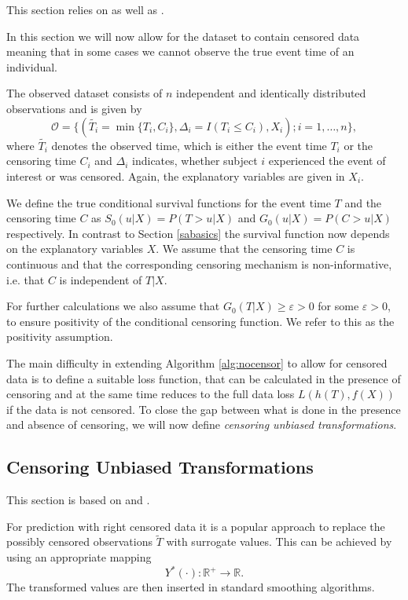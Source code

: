 \documentclass[12pt, a4paper]{scrartcl}
\theoremstyle{definition}
\theoremstyle{plain}
\numberwithin{equation}{section}
\numberwithin{figure}{section}
\numberwithin{table}{section}
\begin{document}
	This section relies on \citet*{basearticle} as well as \citet*{deeplbook}.
	
	In this section we will now allow for the dataset to contain censored data meaning that in some cases we cannot observe the true event time of an individual.
	
	The observed dataset consists of $n$ independent and identically distributed observations and is given by
	$$\mathcal{O} = \{(\tilde{T_i} = \min \{T_i, C_i\}, \Delta_i = I(T_i \leq C_i), X_i); i = 1,\dots,n\},$$
	 where $\tilde{T_i}$ denotes the observed time, which is either the event time $T_i$ or the censoring time $C_i$ and $\Delta_i$ indicates, whether subject $i$ experienced the event of interest or was censored.
	 Again, the explanatory variables are given in $X_i$.
	 
	 We define the true conditional survival functions for the event time $T$ and the censoring time $C$ as $S_0(u \vert X)=P(T>u \vert X)$ and $G_0(u \vert X)=P(C>u \vert X)$ respectively.
	 In contrast to Section \ref{sabasics} the survival function now depends on the explanatory variables $X$.
	 We assume that the censoring time $C$ is continuous and that the corresponding censoring mechanism is non-informative, i.e. that $C$ is independent of $T\vert X$.
	 
	 For further calculations we also assume that $G_0(T \vert X)\geq \varepsilon > 0$ for some $\varepsilon >0$, to ensure positivity of the conditional censoring function.
	 We refer to this as the positivity assumption.
	
	The main difficulty in extending Algorithm \ref{alg:nocensor} to allow for censored data is to define a suitable loss function, that can be calculated in the presence of censoring and at the same time reduces to the full data loss $L(h(T), f(X))$ if the data is not censored.
	To close the gap between what is done in the presence and absence of censoring, we will now define \textit{censoring unbiased transformations}.
	
	\subsection{Censoring Unbiased Transformations}\label{sec:drtrafo}
	This section is based on \citet*{culs} and \citet*{drcut}.
	
	
	For prediction with right censored data it is a popular approach to replace the possibly censored observations $\tilde T$ with surrogate values.
	This can be achieved by using an appropriate mapping $$Y^*(\cdot): \mathbb{R}^+ \to \mathbb{R}.$$
	The transformed values are then inserted in standard smoothing algorithms.
	
\end{document}
